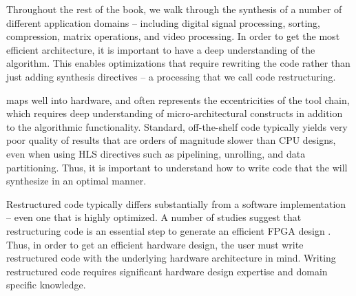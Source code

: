 Throughout the rest of the book, we walk through the synthesis of a number of different application domains -- including digital signal processing, sorting, compression, matrix operations, and video processing. In order to get the most efficient architecture, it is important to have a deep understanding of the algorithm. This enables optimizations that require rewriting the code rather than just adding synthesis directives -- a processing that we call code restructuring. 


 maps well into hardware, and often represents the eccentricities of the tool chain, which requires deep understanding of micro-architectural constructs in addition to the algorithmic functionality. Standard, off-the-shelf code typically yields very poor quality of results that are orders of magnitude slower than CPU designs, even when using HLS directives such as pipelining, unrolling, and data partitioning. Thus, it is important to understand how to write code that the \VHLS will synthesize in an optimal manner.

Restructured code typically differs substantially from a software implementation -- even one that is highly optimized. A number of studies suggest that restructuring code is an essential step to generate an efficient FPGA
design \cite{mataidesigning, matai2energy, cong2011high, chen2012fpga, lee250high}. Thus, in order to get an efficient hardware design, the user must write restructured code with the underlying
hardware architecture in mind. Writing restructured code requires significant
hardware design expertise and domain specific knowledge. 

